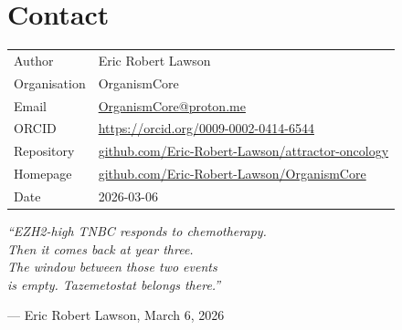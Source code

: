 \documentclass[12pt, a4paper]{article}
\begin{document}
\section*{Contact}

\begin{tabular}{ll}
Author        & Eric Robert Lawson \\
Organisation  & OrganismCore \\
Email         &
  \href{mailto:OrganismCore@proton.me}
       {OrganismCore@proton.me} \\
ORCID         &
  \href{https://orcid.org/0009-0002-0414-6544}
       {https://orcid.org/0009-0002-0414-6544} \\
Repository    &
  \href{https://github.com/Eric-Robert-Lawson/attractor-oncology}
       {github.com/Eric-Robert-Lawson/attractor-oncology} \\
Homepage      &
  \href{https://github.com/Eric-Robert-Lawson/OrganismCore}
       {github.com/Eric-Robert-Lawson/OrganismCore} \\
Date          & 2026-03-06 \\
\end{tabular}

\vspace{2em}

\begin{center}
\itshape
``EZH2-high TNBC responds to chemotherapy.\\
Then it comes back at year three.\\
The window between those two events\\
is empty. Tazemetostat belongs there.''

\medskip
\upshape
--- Eric Robert Lawson, March 6, 2026
\end{center}

\end{document}
